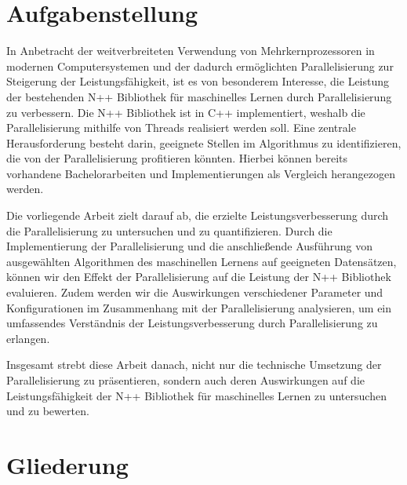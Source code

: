 \section{Aufgabenstellung}
\label{sec:Einleitung_Aufgabenstellung}
In Anbetracht der weitverbreiteten Verwendung von Mehrkernprozessoren in modernen Computersystemen und der dadurch ermöglichten Parallelisierung zur Steigerung der Leistungsfähigkeit, ist es von besonderem Interesse, die Leistung der bestehenden N++ Bibliothek für maschinelles Lernen durch Parallelisierung zu verbessern. Die N++ Bibliothek ist in C++ implementiert, weshalb die Parallelisierung mithilfe von Threads realisiert werden soll. Eine zentrale Herausforderung besteht darin, geeignete Stellen im Algorithmus zu identifizieren, die von der Parallelisierung profitieren könnten. Hierbei können bereits vorhandene Bachelorarbeiten und Implementierungen als Vergleich herangezogen werden.

Die vorliegende Arbeit zielt darauf ab, die erzielte Leistungsverbesserung durch die Parallelisierung zu untersuchen und zu quantifizieren. Durch die Implementierung der Parallelisierung und die anschließende Ausführung von ausgewählten Algorithmen des maschinellen Lernens auf geeigneten Datensätzen, können wir den Effekt der Parallelisierung auf die Leistung der N++ Bibliothek evaluieren. Zudem werden wir die Auswirkungen verschiedener Parameter und Konfigurationen im Zusammenhang mit der Parallelisierung analysieren, um ein umfassendes Verständnis der Leistungsverbesserung durch Parallelisierung zu erlangen.

Insgesamt strebt diese Arbeit danach, nicht nur die technische Umsetzung der Parallelisierung zu präsentieren, sondern auch deren Auswirkungen auf die Leistungsfähigkeit der N++ Bibliothek für maschinelles Lernen zu untersuchen und zu bewerten.

\section{Gliederung}
\label{sec:Einleitung_Gliederung}






